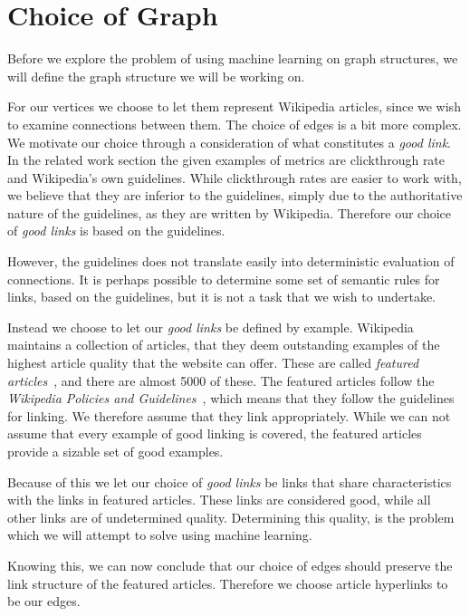 \section{Choice of Graph}\label{sec:choice_of_graph}
Before we explore the problem of using machine learning on graph structures, we will define the graph structure we will be working on.

For our vertices we choose to let them represent Wikipedia articles, since we wish to examine connections between them. The choice of edges is a bit more complex. We motivate our choice through a consideration of what constitutes a \emph{good link}. In the related work section the given examples of metrics are clickthrough rate and Wikipedia's own guidelines. While clickthrough rates are easier to work with, we believe that they are inferior to the guidelines, simply due to the authoritative nature of the guidelines, as they are written by Wikipedia. Therefore our choice of \emph{good links} is based on the guidelines.

However, the guidelines does not translate easily into deterministic evaluation of connections. It is perhaps possible to determine some set of semantic rules for links, based on the guidelines, but it is not a task that we wish to undertake.

Instead we choose to let our \emph{good links} be defined by example. Wikipedia maintains a collection of articles, that they deem outstanding examples of the highest article quality that the website can offer. These are called \emph{featured articles}~\cite{wiki-featured-articles}, and there are almost 5000 of these. The featured articles follow the \emph{Wikipedia Policies and Guidelines}~\cite{wiki-editor-guidelines}, which means that they follow the guidelines for linking. We therefore assume that they link appropriately. While we can not assume that every example of good linking is covered, the featured articles provide a sizable set of good examples.

Because of this we let our choice of \emph{good links} be links that share characteristics with the links in featured articles. These links are considered good, while all other links are of undetermined quality. Determining this quality, is the problem which we will attempt to solve using machine learning.

Knowing this, we can now conclude that our choice of edges should preserve the link structure of the featured articles. Therefore we choose article hyperlinks to be our edges.

